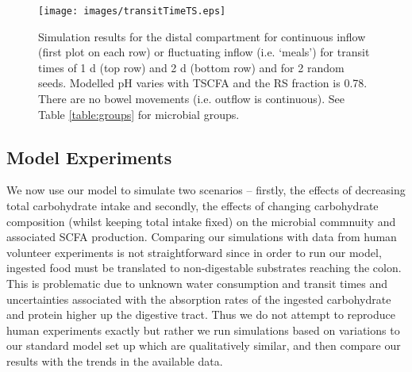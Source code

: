 \documentclass[a4paper]{article}
\begin{document}
 \begin{figure}
    \centering
   \texttt{[image: images/transitTimeTS.eps]}
    \caption{Simulation results for the distal compartment for continuous inflow (first plot on each row) or fluctuating inflow (i.e. `meals') for transit times of 1 d (top row) and 2 d (bottom row) and for 2 random seeds. Modelled pH varies with TSCFA and the RS fraction is 0.78. There are no bowel movements (i.e. outflow is continuous). See Table \ref{table:groups} for microbial groups.
    }
    \label{fig:flucInflowTt}
\end{figure}


\subsection*{Model Experiments}
We now use our model to simulate two scenarios -- firstly, the effects of decreasing total carbohydrate intake and secondly, the effects of changing carbohydrate composition (whilst keeping total intake fixed) on the microbial commnuity and associated SCFA production.
Comparing our simulations with data from human volunteer experiments is not straightforward since in order to run our model, ingested food must be translated to non-digestable substrates reaching the colon. This is problematic due to unknown water consumption and transit times and uncertainties associated with the absorption rates of the ingested carbohydrate and protein higher up the digestive tract.
Thus we do not attempt to reproduce human experiments exactly but rather we run simulations based on variations to our standard model set up which are qualitatively similar, and then compare our results with the trends in the available data.
\end{document}

